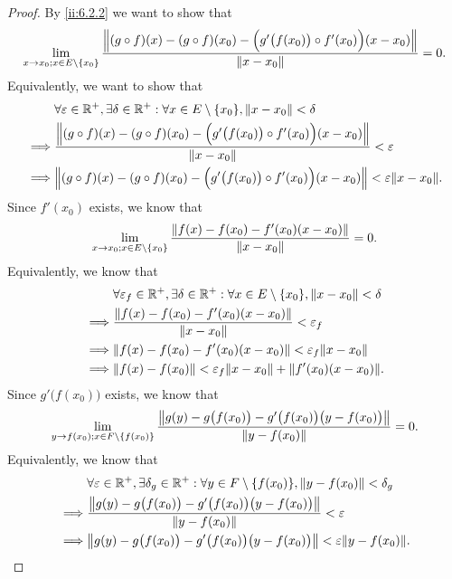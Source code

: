 \begin{proof}
  By \cref{ii:6.2.2} we want to show that
  \[
    \lim_{x \to x_0 ; x \in E \setminus \set{x_0}} \dfrac{\norm*{(g \circ f)(x) - (g \circ f)(x_0) - \Big(g'\big(f(x_0)\big) \circ f'(x_0)\Big)(x - x_0)}}{\norm*{x - x_0}} = 0.
  \]
  Equivalently, we want to show that
  \begin{align*}
             & \forall \varepsilon \in \R^+, \exists \delta \in \R^+ : \forall x \in E \setminus \set{x_0}, \norm*{x - x_0} < \delta                  \\
    \implies & \dfrac{\norm*{(g \circ f)(x) - (g \circ f)(x_0) - \Big(g'\big(f(x_0)\big) \circ f'(x_0)\Big)(x - x_0)}}{\norm*{x - x_0}} < \varepsilon \\
    \implies & \norm*{(g \circ f)(x) - (g \circ f)(x_0) - \Big(g'\big(f(x_0)\big) \circ f'(x_0)\Big)(x - x_0)} < \varepsilon \norm*{x - x_0}.
  \end{align*}
  Since \(f'(x_0)\) exists, we know that
  \[
    \lim_{x \to x_0 ; x \in E \setminus \set{x_0}} \dfrac{\norm*{f(x) - f(x_0) - f'(x_0)(x - x_0)}}{\norm*{x - x_0}} = 0.
  \]
  Equivalently, we know that
  \begin{align*}
             & \forall \varepsilon_f \in \R^+, \exists \delta \in \R^+ : \forall x \in E \setminus \set{x_0}, \norm*{x - x_0} < \delta \\
    \implies & \dfrac{\norm*{f(x) - f(x_0) - f'(x_0)(x - x_0)}}{\norm*{x - x_0}} < \varepsilon_f                                       \\
    \implies & \norm*{f(x) - f(x_0) - f'(x_0)(x - x_0)} < \varepsilon_f \norm*{x - x_0}                                                \\
    \implies & \norm*{f(x) - f(x_0)} < \varepsilon_f \norm*{x - x_0} + \norm*{f'(x_0)(x - x_0)}.
  \end{align*}
  Since \(g'\big(f(x_0)\big)\) exists, we know that
  \[
    \lim_{y \to f(x_0) ; x \in F \setminus \set{f(x_0)}} \dfrac{\norm*{g(y) - g\big(f(x_0)\big) - g'\big(f(x_0)\big)\big(y - f(x_0)\big)}}{\norm*{y - f(x_0)}} = 0.
  \]
  Equivalently, we know that
  \begin{align*}
             & \forall \varepsilon \in \R^+, \exists \delta_g \in \R^+ : \forall y \in F \setminus \set{f(x_0)}, \norm*{y - f(x_0)} < \delta_g \\
    \implies & \dfrac{\norm*{g(y) - g\big(f(x_0)\big) - g'\big(f(x_0)\big)\big(y - f(x_0)\big)}}{\norm*{y - f(x_0)}} < \varepsilon             \\
    \implies & \norm*{g(y) - g\big(f(x_0)\big) - g'\big(f(x_0)\big)\big(y - f(x_0)\big)} < \varepsilon \norm*{y - f(x_0)}.

\end{align*}
\end{proof}

